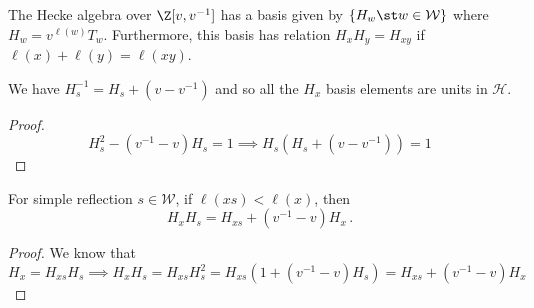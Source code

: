 \documentclass[11pt,leqno,oneside]{amsart}
\numberwithin{thm}{section}
\renewcommand{\W}{\mathcal{W}}
\renewcommand{\H}{\mathcal{H}} %
\begin{document}
\begin{prop}\label{H-basis}
  The Hecke algebra over \(\Z[v,v^{-1}]\) has a basis given by \(\{H_w
  \st w \in \W\}\) where \(H_w = v^{\ell(w)} T_w\). Furthermore, this
  basis has relation \(H_x H_y = H_{xy}\) if \(\ell(x)+\ell(y) = \ell(xy)\).
\end{prop}
\begin{lem}
  We have \(H_s^{-1} = H_s + (v-v^{-1})\) and so all the \(H_x\) basis
  elements are units in \(\H\).
\end{lem}
\begin{proof}
  \[
    H_s^2-(v^{-1}-v)H_s = 1 \implies H_s(H_s+(v-v^{-1})) = 1 
  \]
\end{proof}
\begin{lem}\label{lem:length-lowering-mult}
  For simple reflection \(s \in \W\), if \(\ell(xs) < \ell(x)\),
  then \[
    H_x H_s = H_{xs} + (v^{-1}-v)H_x \,. 
  \]
\end{lem}
\begin{proof}
  We know that \[
    H_x = H_{xs} H_s \implies H_x H_s = H_{xs} H_s^2 =
    H_{xs}(1+(v^{-1}-v)H_s) = H_{xs} + (v^{-1}-v)H_x
  \]
\end{proof}
\end{document}
